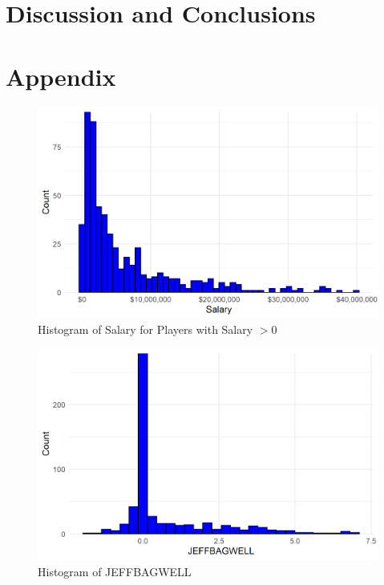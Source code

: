 \documentclass{article}
\begin{document}
\section{Discussion and Conclusions}


%
%

\section{Appendix}

\begin{figure}[h]
\caption{Histogram of Salary for Players with Salary $> 0$}
\label{fig:salary_hist}
\centering
\includegraphics[width=0.7\paperwidth, scale=1.25]{salary_hist.png}
\end{figure}

\begin{figure}[h]
\caption{Histogram of JEFFBAGWELL}
\label{fig:bwar_hist}
\centering
\includegraphics[width=0.7\paperwidth, scale=1.25]{war_hist.png}
\end{figure}


\end{document}
